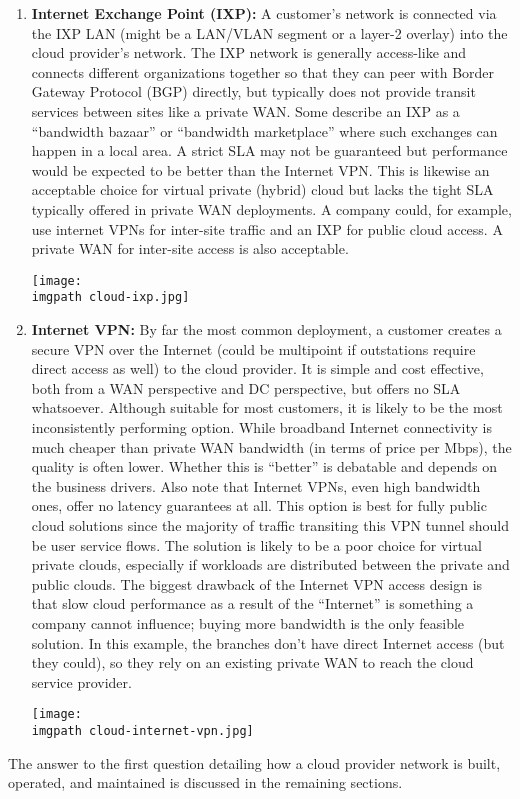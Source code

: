\begin{enumerate}
  \item \textbf{Internet Exchange Point (IXP):} A customer’s network is
  connected via the IXP LAN (might be a LAN/VLAN segment or a layer-2 overlay)
  into the cloud provider’s network. The IXP network is generally access-like
  and connects different organizations together so that they can peer with
  Border Gateway Protocol (BGP) directly, but typically does not provide
  transit services between sites like a private WAN. Some describe an IXP as a
  ``bandwidth bazaar'' or ``bandwidth marketplace'' where such exchanges can
  happen in a local area. A strict SLA may not be guaranteed but performance
  would be expected to be better than the Internet VPN. This is likewise an
  acceptable choice for virtual private (hybrid) cloud but lacks the tight SLA
  typically offered in private WAN deployments. A company could, for example,
  use internet VPNs for inter-site traffic and an IXP for public cloud access.
  A private WAN for inter-site access is also acceptable.

    \begin{minipage}[t]{\linewidth}
	  \centering
      \texttt{[image: \\imgpath cloud-ixp.jpg]}
    \end{minipage}

  \item \textbf{Internet VPN:} By far the most common deployment, a customer
  creates a secure VPN over the Internet (could be multipoint if outstations
  require direct access as well) to the cloud provider. It is simple and cost
  effective, both from a WAN perspective and DC perspective, but offers no SLA
  whatsoever. Although suitable for most customers, it is likely to be the
  most inconsistently performing option. While broadband Internet connectivity
  is much cheaper than private WAN bandwidth (in terms of price per Mbps), the
  quality is often lower. Whether this is ``better'' is debatable and depends on
  the business drivers. Also note that Internet VPNs, even high bandwidth
  ones, offer no latency guarantees at all. This option is best for fully
  public cloud solutions since the majority of traffic transiting this VPN
  tunnel should be user service flows. The solution is likely to be a poor
  choice for virtual private clouds, especially if workloads are distributed
  between the private and public clouds. The biggest drawback of the Internet
  VPN access design is that slow cloud performance as a result of the
  ``Internet'' is something a company cannot influence; buying more bandwidth is
  the only feasible solution. In this example, the branches don’t have direct
  Internet access (but they could), so they rely on an existing private WAN to
  reach the cloud service provider.

    \begin{minipage}[t]{\linewidth}
	  \centering
      \texttt{[image: \\imgpath cloud-internet-vpn.jpg]}
    \end{minipage}
\end{enumerate}

The answer to the first question detailing how a cloud provider network is
built, operated, and maintained is discussed in the remaining sections.
